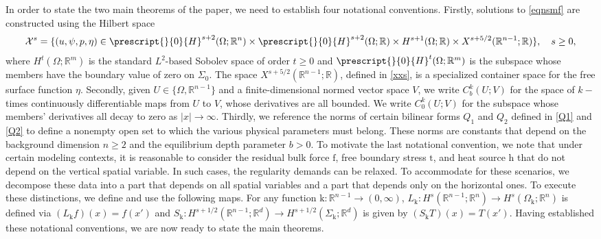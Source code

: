 \documentclass[11pt,letterpaper,reqno]{amsart}
\numberwithin{equation}{section}
\begin{document}
In order to state the two main theorems of the paper, we need to establish four notational conventions. Firstly, solutions to \eqref{eqnsmf} are constructed using the Hilbert space 
\begin{align} \label{Xs}
    \mathcal{X}^{s}=\{(u,\psi,p,\eta) \in \prescript{}{0}{H}^{s+2}(\Omega;\mathbb{R}^{n}) \times \prescript{}{0}{H}^{s+2}(\Omega;\mathbb{R})\times H^{s+1}(\Omega;\mathbb{R}) \times X^{s+5/2}(\mathbb{R}^{n-1};\mathbb{R})\}, \quad s \geq 0,
\end{align}
where \(H^{t}(\Omega;\mathbb{R}^{m})\) is the standard \(L^{2}\)-based Sobolev space of order \(t \geq 0\) and \(\prescript{}{0}{H}^{t}(\Omega;\mathbb{R}^{m})\) is the subspace whose members have the boundary value of zero on \(\Sigma_{0}\). The space \(X^{s+5/2}(\mathbb{R}^{n-1};\mathbb{R})\), defined in \eqref{xxs}, is a specialized container space for the free surface function \(\eta\). Secondly, given $U \in \{\Omega,\mathbb{R}^{n-1}\}$ and a finite-dimensional normed vector space $V$, we write $C^k_{b}(U;V)$ for the space of $k-$times continuously differentiable maps from $U$ to $V$, whose derivatives are all bounded. We write $C^k_0(U;V)$ for the subspace whose members' derivatives all decay to zero as $|x| \to \infty$. Thirdly, we reference the norms of certain bilinear forms \(Q_{1}\) and \(Q_{2}\) defined in \eqref{Q1} and \eqref{Q2} to define a nonempty open set to which the various physical parameters must belong. These norms are constants that depend on the background dimension \(n \geq 2\) and the equilibrium depth parameter \(b>0\). To motivate the last notational convention, we note that under certain modeling contexts, it is reasonable to consider the residual bulk force \(\mathrm{f}\), free boundary stress \(\mathrm{t}\), and heat source \(\mathrm{h}\) that do not depend on the vertical spatial variable. In such cases, the regularity demands can be relaxed. To accommodate for these scenarios, we decompose these data into a part that depends on all spatial variables and a part that depends only on the horizontal ones. To execute these distinctions, we define and use the following maps. For any function \(\mathrm{k}:\mathbb{R}^{n-1} \to (0,\infty)\), \(L_{\mathrm{k}}:H^{s}(\mathbb{R}^{n-1};\mathbb{R}^{n}) \to H^{s}(\Omega_{\mathrm{k}};\mathbb{R}^{n})\) is defined via \((L_{\mathrm{k}}f)(x)=f(x')\) and \(S_{\mathrm{k}}: H^{s+1/2}(\mathbb{R}^{n-1};\mathbb{R}^{d}) \to H^{s+1/2}(\Sigma_{\mathrm{k}};\mathbb{R}^{d})\) is given by \((S_{\mathrm{k}}T)(x)=T(x')\). Having established these notational conventions, we are now ready to state the main theorems.
\end{document}
